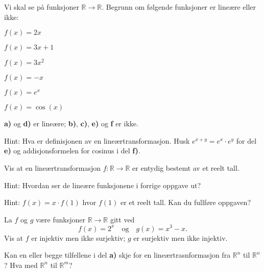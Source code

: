 \begin{oppgave}
\label{oppg:1dlintrans}
Vi skal se på funksjoner $\mathbb{R}\rightarrow \mathbb{R}$. Begrunn om følgende funksjoner er lineære eller ikke:

\begin{punkt}
$f(x) = 2x$
\end{punkt}

\begin{punkt}
$f(x) = 3x+1$
\end{punkt}

\begin{punkt}
$f(x) = 3x^2$
\end{punkt}

\begin{punkt}
$f(x)= -x$
\end{punkt}

\begin{punkt}
$f(x)=e^x$
\end{punkt}

\begin{punkt}
$f(x)=\cos (x)$
\end{punkt}
\end{oppgave}

\begin{losning}

\textbf{a)} og \textbf{d)} er lineære; \textbf{b)}, \textbf{c)}, \textbf{e)} og \textbf{f} er ikke.

\noindent
Hint: Hva er definisjonen av en lineærtransformasjon. Husk $e^{x+y}=e^x\cdot e^y$ for del \textbf{e)} og addisjonsformelen for cosinus i del \textbf{f)}.

\end{losning}


\begin{oppgave}
Vis at en lineærtransformasjon $f:\mathbb{R}\rightarrow \mathbb{R}$ er entydig bestemt av et reelt tall.

\noindent 
Hint: Hvordan ser de lineære funksjonene i forrige oppgave ut?
\end{oppgave}


\begin{losning}
Hint: $f(x)=x\cdot f(1)$ hvor $f(1)$ er et reelt tall. Kan du fullføre oppgaven?
\end{losning}


\begin{oppgave}
\begin{punkt}
La $f$ og $g$ være funksjoner $\mathbb{R}\rightarrow \mathbb{R}$ gitt ved $$f(x)=2^x \quad \text{og} \quad g(x)=x^3-x.$$ Vis at $f$ er injektiv men ikke surjektiv; $g$ er surjektiv men ikke injektiv.

\end{punkt}
\begin{punkt}
Kan en eller begge tilfellene i del \textbf{a)} skje for en lineærtrasnformasjon fra $\mathbb{R}^n$ til $\mathbb{R}^n$? Hva med $\mathbb{R}^n$ til $\mathbb{R}^m$?
\end{punkt}

\end{oppgave}


